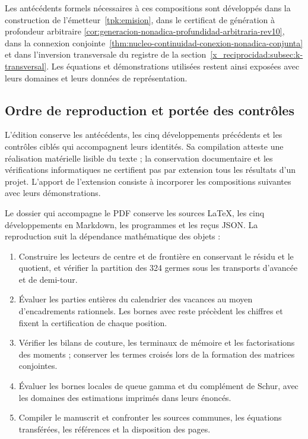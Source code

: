 Les antécédents formels nécessaires à ces compositions sont
développés dans la construction de l'émetteur~\ref{tpk:emision}, dans le
certificat de génération à profondeur arbitraire
\ref{cor:generacion-nonadica-profundidad-arbitraria-rev10}, dans la connexion
conjointe~\ref{thm:nucleo-continuidad-conexion-nonadica-conjunta} et dans
l'inversion transversale du registre de la
section~\ref{x_reciprocidad:subsec:k-transversal}. Les équations et démonstrations
utilisées restent ainsi exposées avec leurs domaines et leurs données de
représentation.

\clearpage
\subsection{Ordre de reproduction et portée des contrôles}

L'édition conserve les antécédents, les cinq développements précédents et les contrôles ciblés qui accompagnent leurs identités. Sa compilation atteste une réalisation matérielle lisible du texte ; la conservation documentaire et les vérifications informatiques ne certifient pas par extension tous les résultats d'un projet. L'apport de l'extension consiste à incorporer les compositions suivantes avec leurs démonstrations.

Le dossier qui accompagne le PDF conserve les sources \LaTeX{}, les cinq
développements en Markdown, les programmes et les reçus JSON. La reproduction
suit la dépendance mathématique des objets :

\begin{enumerate}
\item Construire les lecteurs de centre et de frontière en conservant le résidu et
le quotient, et vérifier la partition des 324 germes sous les transports
d'avancée et de demi-tour.
\item Évaluer les parties entières du calendrier des vacances au moyen
d'encadrements rationnels. Les bornes avec reste précèdent les chiffres et fixent
la certification de chaque position.
\item Vérifier les bilans de couture, les terminaux de mémoire et les
factorisations des moments ; conserver les termes croisés lors de la formation
des matrices conjointes.
\item Évaluer les bornes locales de queue gamma et du complément de Schur,
avec les domaines des estimations imprimés dans leurs énoncés.
\item Compiler le manuscrit et confronter les sources communes, les équations transférées, les références et la disposition des pages.
\end{enumerate}

